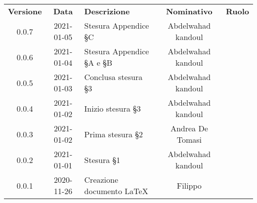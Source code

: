 {
    \renewcommand{\arraystretch}{1.5}
    \centering
    \begin{longtable}{ c c  C{4cm}  c  c }
        \rowcolor{\primaryColor}
        \textcolor{\secondaryColor}{
        \textbf{Versione}}     & \textcolor{\secondaryColor}{\textbf{Data}}       & \textcolor{\secondaryColor}
        {\textbf{Descrizione}} & \textcolor{\secondaryColor}{\textbf{Nominativo}} & \textcolor{\secondaryColor}{\textbf{Ruolo}}                          \\


        0.0.7                  & 2021-01-05                                       & Stesura Appendice §C                         & Abdelwahad kandoul & \redattore{} \\
        0.0.6                  & 2021-01-04                                       & Stesura Appendice §A e §B                          & Abdelwahad kandoul & \redattore{} \\
        0.0.5                  & 2021-01-03                                       & Conclusa stesura §3                            & Abdelwahad kandoul & \redattore{} \\
        0.0.4                  & 2021-01-02                                       & Inizio stesura §3                            & Abdelwahad kandoul & \redattore{} \\
        0.0.3                  & 2021-01-02                                       & Prima stesura §2                              & Andrea De Tomasi & \redattore{} \\
        0.0.2                  & 2021-01-01                                       & Stesura §1                            & Abdelwahad kandoul & \redattore{} \\
        0.0.1                  & 2020-11-26                                       & Creazione documento \LaTeX{}                                & Filippo  & \progettista{} \\
    
    
    \end{longtable}
}